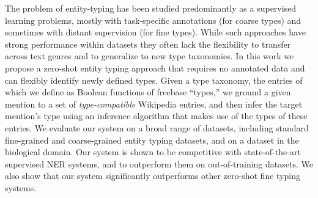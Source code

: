 The problem of entity-typing has been studied predominantly as a supervised learning problems, mostly with task-specific annotations (for coarse types) and sometimes with distant supervision (for fine types). While such approaches have strong performance within datasets they often lack the flexibility to transfer across text genres and to generalize to new type taxonomies. In this work we propose a zero-shot entity typing approach that requires no annotated data and can flexibly identify newly defined types. Given a  type taxonomy, the entries of which we define as Boolean functions of freebase ``types,'' we ground a given mention to a set of {\em type-compatible} Wikipedia entries, and then infer the target mention's type using an inference algorithm that makes use of the types of these entries. We evaluate our system on a broad range of datasets, including standard fine-grained and coarse-grained entity typing datasets, and on a dataset in the biological domain. Our system is shown to be competitive with  state-of-the-art supervised NER systems, and to outperform them on out-of-training datasets. We also show that our system significantly outperforms other zero-shot fine typing systems.
